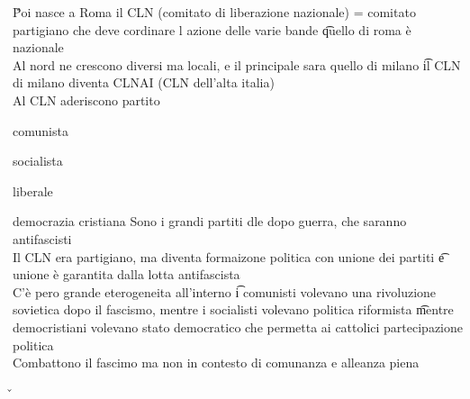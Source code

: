 \documentclass[12pt]{article}
\begin{document}
\v

Poi nasce a Roma il CLN (comitato di liberazione nazionale) = comitato partigiano che deve cordinare l azione delle varie bande \t quello di roma è nazionale \\
Al nord ne crescono diversi ma locali, e il principale sara quello di milano \t il CLN di milano diventa CLNAI (CLN dell'alta italia) \\
Al CLN aderiscono partito 
\bi
    \item comunista
    \item socialista
    \item liberale
    \item democrazia cristiana
\ei
Sono i grandi partiti dle dopo guerra, che saranno antifascisti \\
Il CLN era partigiano, ma diventa formaizone politica con unione dei partiti \t e unione è garantita dalla lotta antifascista \\
C'è pero grande eterogeneita all'interno \t i comunisti volevano una rivoluzione sovietica dopo il fascismo, mentre i socialisti volevano politica riformista \t mentre democristiani volevano stato democratico che permetta ai cattolici partecipazione politica \\
Combattono il fascimo ma non in contesto di comunanza e alleanza piena

\v
\end{document}
